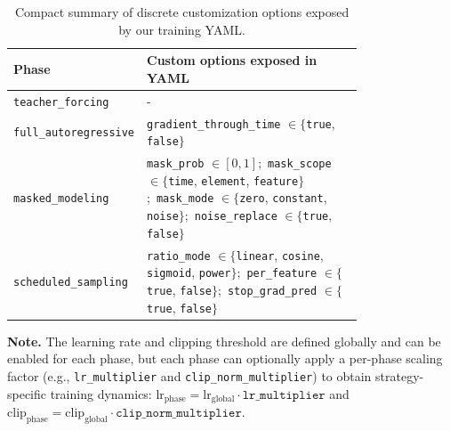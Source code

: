 
\begin{table}[H]
\centering
\small
\renewcommand{\arraystretch}{1.15}
\begin{tabular}{l p{0.78\linewidth}}
\hline
\textbf{Phase} & \textbf{Custom options exposed in YAML} \\
\hline
\texttt{teacher\_forcing} &
- \\
\texttt{full\_autoregressive} &
\texttt{gradient\_through\_time} $\in\{$\texttt{true}, \texttt{false}$\}$ \\
\texttt{masked\_modeling} &
\texttt{mask\_prob} $\in [0,1]$;\ 
\texttt{mask\_scope} $\in\{$\texttt{time}, \texttt{element}, \texttt{feature}$\}$;\ 
\texttt{mask\_mode} $\in\{$\texttt{zero}, \texttt{constant}, \texttt{noise}$\}$;\ 
\texttt{noise\_replace} $\in\{$\texttt{true}, \texttt{false}$\}$ \\
\texttt{scheduled\_sampling} &
\texttt{ratio\_mode} $\in\{$\texttt{linear}, \texttt{cosine}, \texttt{sigmoid}, \texttt{power}$\}$;\ 
\texttt{per\_feature} $\in\{$\texttt{true}, \texttt{false}$\}$;\ 
\texttt{stop\_grad\_pred} $\in\{$\texttt{true}, \texttt{false}$\}$ \\
\hline
\end{tabular}
\caption{Compact summary of discrete customization options exposed by our training YAML.}
\label{tab:phases_yaml_options}
\end{table}

\noindent\textbf{Note.} The learning rate and clipping threshold are defined globally and can be enabled for each phase, but each phase can optionally apply a per-phase scaling factor (e.g., \texttt{lr\_multiplier} and \texttt{clip\_norm\_multiplier}) to obtain strategy-specific training dynamics:
$\mathrm{lr}_{\mathrm{phase}}=\mathrm{lr}_{\mathrm{global}}\cdot \texttt{lr\_multiplier}$ and
$\mathrm{clip}_{\mathrm{phase}}=\mathrm{clip}_{\mathrm{global}}\cdot \texttt{clip\_norm\_multiplier}$.
